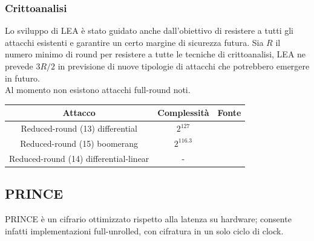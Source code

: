 \documentclass[target=bach,aauheader=,style=]{thud}
\begin{document}
			\subsubsection{Crittoanalisi}
			Lo sviluppo di LEA è stato guidato anche dall'obiettivo di resistere a tutti gli attacchi esistenti e garantire un certo margine di sicurezza futura. Sia $R$ il numero minimo di round per resistere a tutte le tecniche di crittoanalisi, LEA ne prevede $3R/2$ in previsione di nuove tipologie di attacchi che potrebbero emergere in futuro.\\
			Al momento non esistono attacchi full-round noti.
			\begin{center}
				\begin{tabular}{ |c|c|c| } 
					\hline
					Attacco & Complessità & Fonte \\ 
					\hline 
					\hline
					Reduced-round (13) differential & $2^{127}$ & \cite{leadiff} \\
					\hline
					Reduced-round (15) boomerang & $2^{116.3}$ & \cite{lea} \\
					\hline
					Reduced-round (14) differential-linear & - & \cite{lea} \\
					\hline
				\end{tabular}
			\end{center}
		\subsection{PRINCE}\cite{prince}
		\label{ssec:prince}
			PRINCE è un cifrario ottimizzato rispetto alla latenza su  hardware; consente infatti implementazioni full-unrolled, con cifratura in un solo ciclo di clock.
\end{document}
